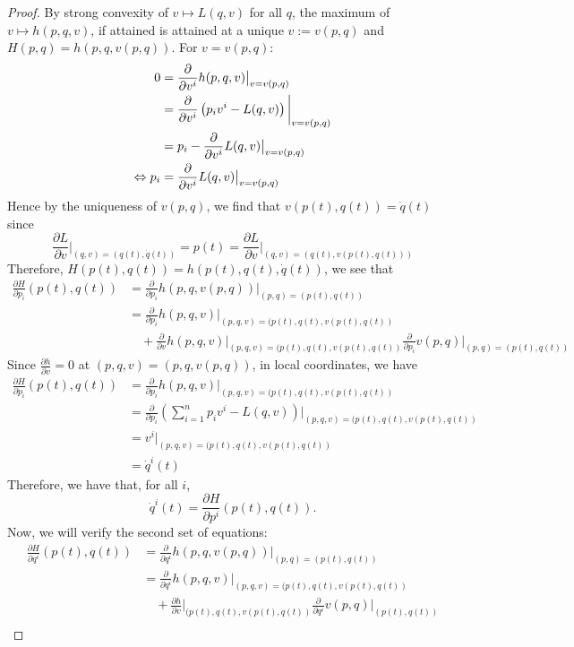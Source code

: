\documentclass{article}
\newcommand{\pd}[1]{\frac{\partial}{\partial #1}}
\newcommand{\pdof}[2]{\frac{\partial #1}{\partial #2}}
\begin{document}
\begin{proof}
    By strong convexity of $v\mapsto L(q,v)$ for all $q$, the maximum of $v\mapsto h(p,q,v)$, if attained is attained at a unique $v:=v(p,q)$ and $H(p,q) = h(p,q,v(p,q))$. For $v = v(p,q)$:
    \begin{align}
        0 &= \pd{v^i}h(p,q,v)\big|_{v=v(p,q)}\notag\\
        &= \pd{v^i}\left(p_iv^i - L(q,v)\right)\bigg|_{v=v(p,q)}\notag\\
        &= p_i - \pd{v^i}L(q,v)\big|_{v=v(p,q)}\notag\\
        \Leftrightarrow p_i &= \pd{v^i}L(q,v)\big|_{v=v(p,q)}
    \end{align}
    Hence by the uniqueness of $v(p,q)$, we find that $v(p(t),q(t)) = \dot q(t)$ since
    \[\pdof{L}{v}\bigg|_{(q,v)=(q(t),\dot q(t))} = p(t) = \pdof{L}{v}\bigg|_{(q,v) = (q(t),v(p(t),q(t)))}\]
    Therefore, $H(p(t),q(t)) = h(p(t),q(t),\dot q(t))$, we see that
    \begin{align*}
        \pdof{H}{p_i}(p(t),q(t))&=\pd{p_i} h(p,q,v(p,q))\big|_{(p,q) = (p(t),q(t))}\\
        &=\pd{p_i} h(p,q,v)\big|_{(p,q,v) = (p(t),q(t), v(p(t),q(t))} \\
        &\quad+ \pd{v}h(p,q,v)\big|_{(p,q,v) = (p(t),q(t), v(p(t),q(t))}\pd{p_i}v(p,q)\big|_{(p,q) = (p(t),q(t))}
    \end{align*}
    Since $\pdof{h}{v}=0$ at $(p,q,v) = (p,q,v(p,q))$, in local coordinates, we have
    \begin{align*}
        \pdof{H}{p_i}(p(t),q(t))&=\pd{p_i} h(p,q,v)\big|_{(p,q,v) = (p(t),q(t), v(p(t),q(t))}\\
        &=\pd{p_i} \left(\sum_{i=1}^n p_iv^i - L(q,v)\right)\big|_{(p,q,v) = (p(t),q(t), v(p(t),q(t))}\\
        &=v^i|_{(p,q,v) = (p(t),q(t), v(p(t),q(t))}\\
        &=\dot q^i(t)
    \end{align*}
    Therefore, we have that, for all $i$,
    \[\dot q^i(t) = \pdof{H}{p^i}(p(t),q(t)).\]
    Now, we will verify the second set of equations:
    \begin{align*}
        \pdof{H}{q^i}(p(t),q(t))&=\pd{q^i} h(p,q,v(p,q))\big|_{(p,q) = (p(t),q(t))}\\
        &=\pd{q^i} h(p,q,v)\big|_{(p,q,v) = (p(t),q(t), v(p(t),q(t))} \\
        &\quad+ \pdof{h}{v}\big|_{(p(t),q(t), v(p(t),q(t))}\pd{q^i}v(p,q)\big|_{(p(t),q(t))}\\

\end{align*}
\end{proof}
\end{document}
